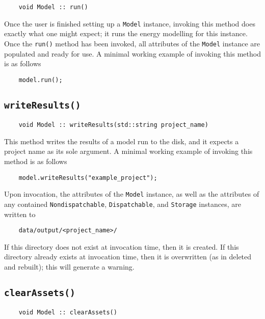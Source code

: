 \documentclass[12pt, letterpaper]{report}
\begin{document}
\begin{verbatim}
    void Model :: run()
\end{verbatim}

Once the user is finished setting up a \texttt{Model} instance, invoking this method does exactly what one might expect; it runs the energy modelling for this instance. Once the \texttt{run()} method has been invoked, all attributes of the \texttt{Model} instance are populated and ready for use. A minimal working example of invoking this method is as follows

\begin{verbatim}
    model.run();
\end{verbatim}

\subsection{\texttt{writeResults(\;\;)}}

\begin{verbatim}
    void Model :: writeResults(std::string project_name)
\end{verbatim}

This method writes the results of a model run to the disk, and it expects a project name as its sole argument. A minimal working example of invoking this method is as follows

\begin{verbatim}
    model.writeResults("example_project");
\end{verbatim}

\noindent Upon invocation, the attributes of the \texttt{Model} instance, as well as the attributes of any contained \texttt{Nondispatchable}, \texttt{Dispatchable}, and \texttt{Storage} instances, are written to

\begin{verbatim}
    data/output/<project_name>/
\end{verbatim}

\noindent If this directory does not exist at invocation time, then it is created. If this directory already exists at invocation time, then it is overwritten (as in deleted and rebuilt); this will generate a warning.

\subsection{\texttt{clearAssets(\;\;)}}

\begin{verbatim}
    void Model :: clearAssets()
\end{verbatim}
\end{document}
